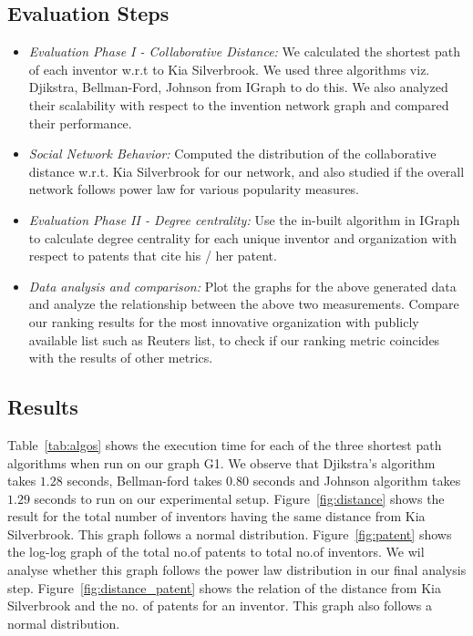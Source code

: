 \subsection{Evaluation Steps}
	\begin{itemize}
		\squish
		\item {\em Evaluation Phase I - Collaborative Distance:} We calculated the 
		shortest path of each inventor w.r.t to Kia Silverbrook. We used three
		algorithms viz. Djikstra, Bellman-Ford, Johnson from IGraph to do this. We
		also analyzed their scalability with respect to the invention network graph
		and compared their performance.
		\item {\em Social Network Behavior:} Computed the distribution of the 
		collaborative distance w.r.t. Kia Silverbrook for our network, and also studied
		if the overall network follows power law for various popularity measures.
		\item {\em Evaluation Phase II - Degree centrality:} Use the in-built
		algorithm in IGraph to calculate degree centrality
		for each unique inventor and organization with respect to patents that cite his / her patent.
		\item {\em Data analysis and comparison:} Plot the graphs for the above
		generated data and analyze the relationship between the above two
		measurements. Compare our ranking results for the most innovative organization
		with publicly available list such as Reuters list, to check if our ranking
		metric coincides with the results of other metrics.
	\end{itemize}

\subsection{Results}
Table~\ref{tab:algos} shows the execution time for each of the three shortest
path algorithms  when run on our graph G1. We observe that Djikstra's
algorithm takes $1.28$ seconds, Bellman-ford takes $0.80$ seconds and Johnson
algorithm takes $1.29$ seconds to run on our experimental setup.
Figure~\ref{fig:distance} shows the result for the total number of inventors
having the same distance from Kia Silverbrook. This graph follows a normal
distribution. Figure~\ref{fig:patent} shows the log-log graph of the total
no.of patents to total no.of inventors. We wil analyse whether this graph
follows the power law distribution in our  final analysis step.
Figure~\ref{fig:distance_patent} shows the relation of the distance from
Kia Silverbrook and the no. of patents for an inventor. This graph also follows a
normal distribution.



